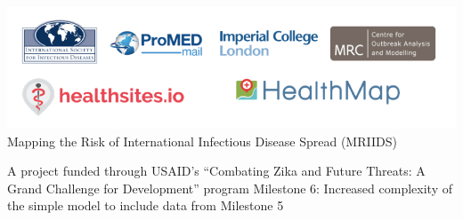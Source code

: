 \documentclass{article}
\begin{document}
\begin{titlepage}
  \centering
    \includegraphics[width=\linewidth]{ms6-figures/logo} %
    \linespread{1.2}\Large{Mapping the Risk of International Infectious Disease Spread
    (MRIIDS)}

   \linespread{1.2}\large{A project funded through USAID’s ``Combating Zika and
     Future Threats: A Grand Challenge for Development'' program}
   \vfill
    Milestone 6: Increased complexity of the simple model to include data from Milestone 5
    \vfill
  \end{titlepage}
\end{document}
